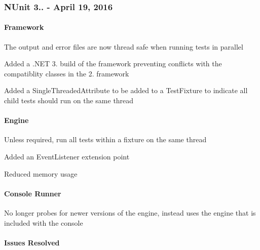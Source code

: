 \subsubsection*{N\+Unit 3.. -\/ April 19, 2016}

\paragraph*{Framework}


\begin{DoxyItemize}
\item The output and error files are now thread safe when running tests in parallel
\item Added a .N\+ET 3. build of the framework preventing conflicts with the compatiblity classes in the 2. framework
\item Added a Single\+Threaded\+Attribute to be added to a Test\+Fixture to indicate all child tests should run on the same thread
\end{DoxyItemize}

\paragraph*{Engine}


\begin{DoxyItemize}
\item Unless required, run all tests within a fixture on the same thread
\item Added an Event\+Listener extension point
\item Reduced memory usage
\end{DoxyItemize}

\paragraph*{Console Runner}


\begin{DoxyItemize}
\item No longer probes for newer versions of the engine, instead uses the engine that is included with the console
\end{DoxyItemize}

\paragraph*{Issues Resolved}


